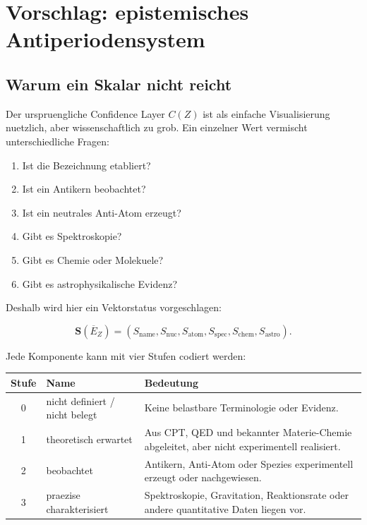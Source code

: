 \documentclass[11pt,a4paper]{article}
\begin{document}
\section{Vorschlag: epistemisches Antiperiodensystem}

\subsection{Warum ein Skalar nicht reicht}

Der urspruengliche Confidence Layer $C(Z)$ ist als einfache Visualisierung nuetzlich, aber wissenschaftlich zu grob. Ein einzelner Wert vermischt unterschiedliche Fragen:

\begin{enumerate}
  \item Ist die Bezeichnung etabliert?
  \item Ist ein Antikern beobachtet?
  \item Ist ein neutrales Anti-Atom erzeugt?
  \item Gibt es Spektroskopie?
  \item Gibt es Chemie oder Molekuele?
  \item Gibt es astrophysikalische Evidenz?
\end{enumerate}

Deshalb wird hier ein Vektorstatus vorgeschlagen:

\begin{equation}
\mathbf{S}(\overline{E}_Z)=
\left(S_{\mathrm{name}},S_{\mathrm{nuc}},S_{\mathrm{atom}},S_{\mathrm{spec}},S_{\mathrm{chem}},S_{\mathrm{astro}}\right).
\end{equation}

Jede Komponente kann mit vier Stufen codiert werden:

\begin{center}
\begin{tabular}{clp{}}
\toprule
\textbf{Stufe} & \textbf{Name} & \textbf{Bedeutung}\\
\midrule
0 & nicht definiert / nicht belegt & Keine belastbare Terminologie oder Evidenz.\\
1 & theoretisch erwartet & Aus CPT, QED und bekannter Materie-Chemie abgeleitet, aber nicht experimentell realisiert.\\
2 & beobachtet & Antikern, Anti-Atom oder Spezies experimentell erzeugt oder nachgewiesen.\\
3 & praezise charakterisiert & Spektroskopie, Gravitation, Reaktionsrate oder andere quantitative Daten liegen vor.\\
\bottomrule
\end{tabular}
\end{center}
\end{document}
